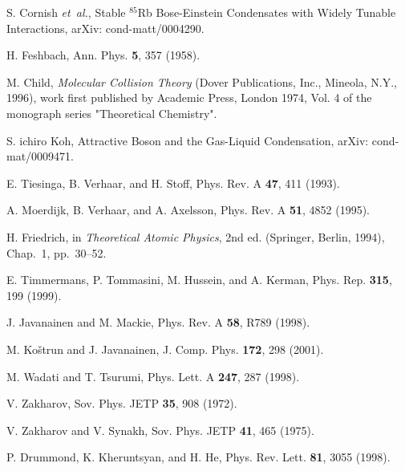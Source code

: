 \documentclass[%
   final       %
]{prospectus}
\begin{document}
\begin{thebibliography}{10}
S. Cornish {\it et~al.}, Stable $^{85}$Rb Bose-Einstein Condensates with Widely
  Tunable Interactions, arXiv: cond-matt/0004290.

H. Feshbach, Ann. Phys. {\bf 5},  357  (1958).

M. Child, {\em Molecular Collision Theory} (Dover Publications, Inc., Mineola,
  N.Y., 1996), work first published by Academic Press, London 1974, Vol. 4 of
  the monograph series "Theoretical Chemistry".

S. ichiro Koh, Attractive Boson and the Gas-Liquid Condensation, arXiv:
  cond-mat/0009471.

E. Tiesinga, B. Verhaar, and H. Stoff, Phys. Rev. A {\bf 47},  411  (1993).

A. Moerdijk, B. Verhaar, and A. Axelsson, Phys. Rev. A {\bf 51},  4852  (1995).

H. Friedrich,  in {\em Theoretical Atomic Physics}, 2nd ed. (Springer, Berlin,
  1994), Chap.~1, pp.\ 30--52.

E. Timmermans, P. Tommasini, M. Hussein, and A. Kerman, Phys. Rep. {\bf 315},
  199  (1999).

J. Javanainen and M. Mackie, Phys. Rev. A {\bf 58},  R789  (1998).

M. Ko\v{s}trun and J. Javanainen, J. Comp. Phys. {\bf 172},  298  (2001).

M. Wadati and T. Tsurumi, Phys. Lett. A {\bf 247},  287  (1998).

V. Zakharov, Sov. Phys. JETP {\bf 35},  908  (1972).

V. Zakharov and V. Synakh, Sov. Phys. JETP {\bf 41},  465  (1975).

P. Drummond, K. Kheruntsyan, and H. He, Phys. Rev. Lett. {\bf 81},  3055
  (1998).

\end{thebibliography}

\backmatter %
\end{document}
